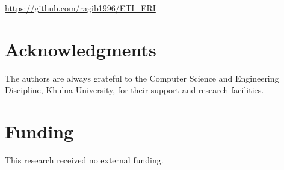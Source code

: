 \documentclass[a4paper,fleqn]{cas-dc}
\begin{document}
\url{https://github.com/ragib1996/ETI_ERI}




\section*{Acknowledgments}

The authors are always grateful to the Computer Science and Engineering  Discipline, Khulna University, for their support and research facilities.




\section*{Funding}
This research received no external funding.



%





\end{document}
